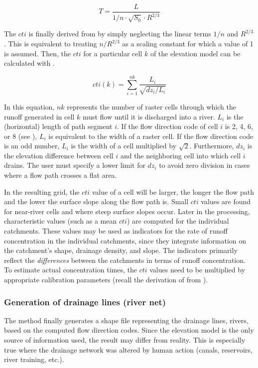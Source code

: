 \begin{equation}
  T= \frac{L}{1/n \cdot \sqrt{S_0} \cdot R^{2/3}} \label{eqn:topocatch:traveltime}
\end{equation}

The $cti$ is finally derived from  by simply neglecting the linear terms $1/n$ and $R^{2/3}$. This is equivalent to treating $n/R^{2/3}$ as a scaling constant for which a value of 1 is assumed. Then, the $cti$ for a particular cell $k$ of the elevation model can be calculated with .

\begin{equation}
  cti(k)= \sum_{i=1}^{nk}{\frac{L_i}{\sqrt{dz_i / L_i}}} \label{eqn:topocatch:cti}
\end{equation}

In this equation, $nk$ represents the number of raster cells through which the runoff generated in cell $k$ must flow until it is discharged into a river. $L_i$ is the (horizontal) length of path segment $i$. If the flow direction code of cell $i$ is 2, 4, 6, or 8 (see ), $L_i$ is equivalent to the width of a raster cell. If the flow direction code is an odd number, $L_i$ is the width of a cell multiplied by $\sqrt{2}$. Furthermore, $dz_i$ is the elevation difference between cell $i$ and the neighboring cell into which cell $i$ drains. The user must specify a lower limit for $dz_i$ to avoid zero division in cases where a flow path crosses a flat area.

In the resulting grid, the $cti$ value of a cell will be larger, the longer the flow path and the lower the surface slope along the flow path is. Small $cti$ values are found for near-river cells and where steep surface slopes occur. Later in the processing, characteristic values (such as a mean $cti$) are computed for the individual catchments. These values may be used as indicators for the rate of runoff concentration in the individual catchments, since they integrate information on the catchment's shape, drainage density, and slope. The indicators primarily reflect the \emph{differences} between the catchments in terms of runoff concentration. To estimate actual concentration times, the $cti$ values need to be multiplied by appropriate calibration parameters (recall the derivation of  from ).

\subsubsection*{Generation of drainage lines (river net)}
The  method finally generates a shape file representing the drainage lines, \ie{}rivers, based on the computed flow direction codes. Since the elevation model is the only source of information used, the result may differ from reality. This is especially true where the drainage network was altered by human action (canals, reservoirs, river training, etc.).

